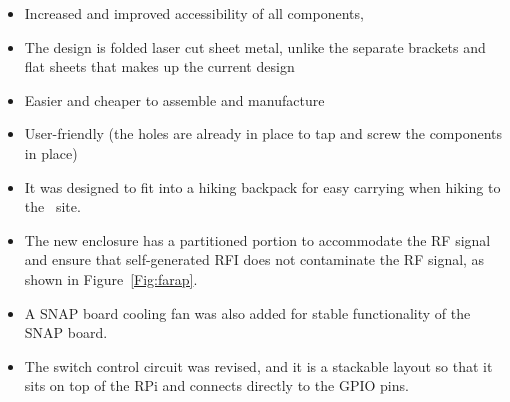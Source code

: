\begin{itemize}
	\item Increased and improved accessibility of all components,
	\item The design is folded laser cut sheet metal, unlike the separate brackets and flat sheets that makes up the current design
	\item Easier and cheaper to assemble and manufacture
	\item User-friendly (the holes are already in place to tap and screw the components in place)
	\item It was designed to fit into a hiking backpack for easy carrying when hiking to the \prizm\ site.
	\item The new enclosure has a partitioned portion to accommodate the RF signal and ensure that self-generated RFI does not contaminate the RF signal, as shown in Figure~\ref{Fig:farap}.
	\item A SNAP board cooling fan was also added for stable functionality of the SNAP board.
	\item The switch control circuit was revised, and it is a stackable layout so that it sits on top of the RPi and connects directly to the GPIO pins.    	
\end{itemize}

